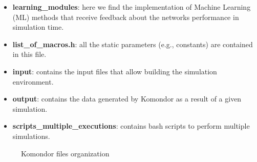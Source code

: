 \documentclass[a4paper]{article}
\begin{document}
\begin{itemize}
	\item \textbf{learning\_modules}: here we find the implementation of Machine Learning (ML) methods that receive feedback about the networks performance in simulation time. 
	\item \textbf{list\_of\_macros.h}: all the static parameters (e.g., constants) are contained in this file.
	\item \textbf{input}: contains the input files that allow building the simulation environment.
	\item \textbf{output}: contains the data generated by Komondor as a result of a given simulation.	
	\item \textbf{scripts\_multiple\_executions}: contains bash scripts to perform multiple simulations.
\end{itemize} 

\begin{figure}[h!]
	\centering
	\caption{Komondor files organization}
	\label{fig:komondor_files}
\end{figure}	

\end{document}

